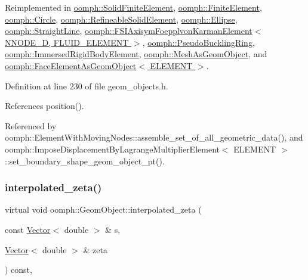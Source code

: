 Reimplemented in \hyperlink{classoomph_1_1SolidFiniteElement_a2457ad75b45257b536090d9b1a6f1331}{oomph\+::\+Solid\+Finite\+Element}, \hyperlink{classoomph_1_1FiniteElement_aa119a9aaad3d2ebb54ff085726c3708d}{oomph\+::\+Finite\+Element}, \hyperlink{classoomph_1_1Circle_ab48e086bc4f484e155ebb2edd6e90040}{oomph\+::\+Circle}, \hyperlink{classoomph_1_1RefineableSolidElement_a3f20de56e3a920644b01dac184f67ef1}{oomph\+::\+Refineable\+Solid\+Element}, \hyperlink{classoomph_1_1Ellipse_a99f443c61294d5cd12a1412a8a3b0b3e}{oomph\+::\+Ellipse}, \hyperlink{classoomph_1_1StraightLine_ad1e8c652c277e1f7649a5afb5711afc0}{oomph\+::\+Straight\+Line}, \hyperlink{classoomph_1_1FSIAxisymFoepplvonKarmanElement_a4aa016e0164dad96f66ff98af98889e6}{oomph\+::\+F\+S\+I\+Axisym\+Foepplvon\+Karman\+Element$<$ N\+N\+O\+D\+E\+\_\+D, F\+L\+U\+I\+D\+\_\+\+E\+L\+E\+M\+E\+N\+T $>$}, \hyperlink{classoomph_1_1PseudoBucklingRing_a5f53b50c00bf2cf98db90a09dc65b410}{oomph\+::\+Pseudo\+Buckling\+Ring}, \hyperlink{classoomph_1_1ImmersedRigidBodyElement_adf0e61dfcf35f8be55dab30dd8e0ccb5}{oomph\+::\+Immersed\+Rigid\+Body\+Element}, \hyperlink{classoomph_1_1MeshAsGeomObject_a8d19ac59e6b236c61ffbcd434ad3b339}{oomph\+::\+Mesh\+As\+Geom\+Object}, and \hyperlink{classoomph_1_1FaceElementAsGeomObject_ac086288f59f368278b08894a00e990fa}{oomph\+::\+Face\+Element\+As\+Geom\+Object$<$ E\+L\+E\+M\+E\+N\+T $>$}.



Definition at line 230 of file geom\+\_\+objects.\+h.



References position().



Referenced by oomph\+::\+Element\+With\+Moving\+Nodes\+::assemble\+\_\+set\+\_\+of\+\_\+all\+\_\+geometric\+\_\+data(), and oomph\+::\+Impose\+Displacement\+By\+Lagrange\+Multiplier\+Element$<$ E\+L\+E\+M\+E\+N\+T $>$\+::set\+\_\+boundary\+\_\+shape\+\_\+geom\+\_\+object\+\_\+pt().

\mbox{\label{classoomph_1_1GeomObject_a1c5530baea63e377937920d2dcf0d583}} 
\subsubsection{\texorpdfstring{interpolated\+\_\+zeta()}{interpolated\_zeta()}}
{\footnotesize\ttfamily virtual void oomph\+::\+Geom\+Object\+::interpolated\+\_\+zeta (\begin{DoxyParamCaption}\item[{const \hyperlink{classoomph_1_1Vector}{Vector}$<$ double $>$ \&}]{s,  }\item[{\hyperlink{classoomph_1_1Vector}{Vector}$<$ double $>$ \&}]{zeta }\end{DoxyParamCaption}) const\hspace{0.3cm}{\ttfamily [inline]}, {\ttfamily [virtual]}}



